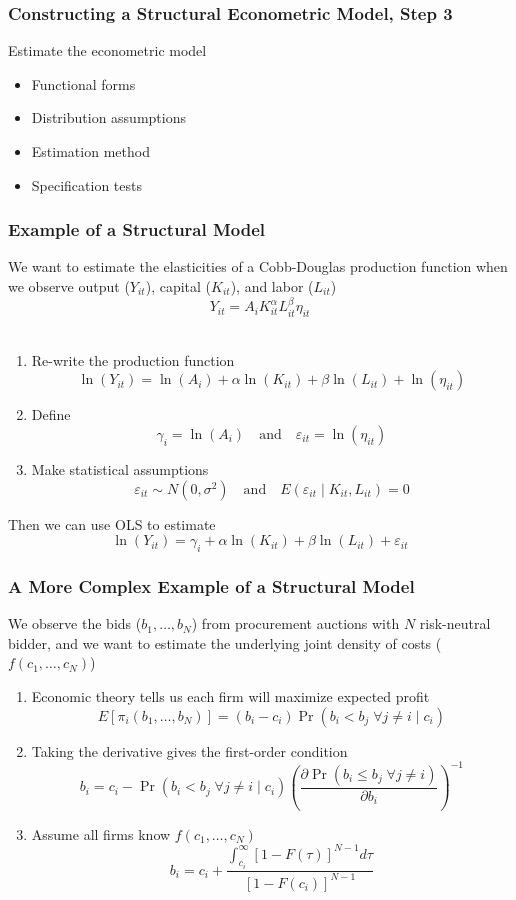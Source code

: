 \documentclass{beamer}
\begin{document}
\begin{frame}\frametitle{Constructing a Structural Econometric Model, Step 3}
    Estimate the econometric model
    \begin{itemize}
        \item Functional forms
        \item Distribution assumptions
        \item Estimation method
        \item Specification tests
    \end{itemize}
\end{frame}

\begin{frame}\frametitle{Example of a Structural Model}
    We want to estimate the elasticities of a Cobb-Douglas production function when we observe output ($Y_{it}$), capital ($K_{it}$), and labor ($L_{it}$)
    $$Y_{it} = A_i K_{it}^\alpha L_{it}^\beta \eta_{it}$$ \\
    \begin{enumerate}
        \item Re-write the production function
        $$\ln(Y_{it}) = \ln(A_i) + \alpha \ln(K_{it}) + \beta \ln(L_{it}) + \ln(\eta_{it})$$
        \item Define
        $$\gamma_i = \ln(A_i) \quad \text{and} \quad \varepsilon_{it} = \ln(\eta_{it})$$
        \item Make statistical assumptions
        $$\varepsilon_{it} \sim N(0, \sigma^2) \quad \text{and} \quad E(\varepsilon_{it} \mid K_{it}, L_{it}) = 0$$
    \end{enumerate}
    Then we can use OLS to estimate
    $$\ln(Y_{it}) = \gamma_i + \alpha \ln(K_{it}) + \beta \ln(L_{it}) + \varepsilon_{it}$$
\end{frame}

\begin{frame}\frametitle{A More Complex Example of a Structural Model}
    We observe the bids ($b_1, \ldots, b_N$) from procurement auctions with $N$ risk-neutral bidder, and we want to estimate the underlying joint density of costs ($f(c_1, \ldots, c_N)$)
    \begin{enumerate}
        \item Economic theory tells us each firm will maximize expected profit
        $$E[\pi_i(b_1, \ldots, b_N)] = (b_i - c_i) \Pr(b_i < b_j \; \forall j \neq i \mid c_i)$$
        \item Taking the derivative gives the first-order condition
        $$b_i = c_i - \Pr(b_i < b_j \; \forall j \neq i \mid c_i) \left( \frac{\partial \Pr(b_i \leq b_j \; \forall j \neq i)}{\partial b_i} \right)^{-1}$$
        \item Assume all firms know $f(c_1, \ldots, c_N)$
        $$b_i = c_i + \frac{\int_{c_i}^\infty [1 - F(\tau)]^{N - 1} d\tau}{[1 - F(c_i)]^{N - 1}}$$
    \end{enumerate}
\end{frame}
\end{document}
